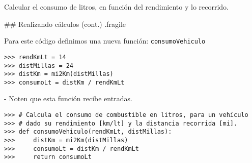 
\bgnblocknormal
Calcular el consumo de litros, en función del rendimiento y lo recorrido.
\trmblocknormal

\trmcolumns

## Realizando cálculos (cont.) {.fragile}

\vspace*{-3ex}
\bgncolumns


\bgnblocknormal
Para este código definimos una nueva función: \texttt{consumoVehiculo}
\trmblocknormal


\begin{lstlisting}
>>> rendKmLt = 14
>>> distMillas = 24
>>> distKm = mi2Km(distMillas)
>>> consumoLt = distKm / rendKmLt
\end{lstlisting}

\trmcolumns

\vfill

- Noten que esta función recibe  entradas.

\vfill

\begin{lstlisting}[style=frame01]
>>> # Calcula el consumo de combustible en litros, para un vehículo
>>> # dado su rendimiento [km/lt] y la distancia recorrida [mi].
>>> def consumoVehiculo(rendKmLt, distMillas):
>>>     distKm = mi2Km(distMillas)
>>>     consumoLt = distKm / rendKmLt
>>>     return consumoLt
\end{lstlisting}

